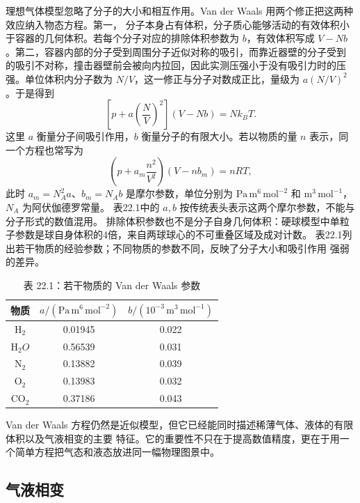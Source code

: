 理想气体模型忽略了分子的大小和相互作用。Van der Waals 用两个修正把这两种效应纳入物态方程。第一，
分子本身占有体积，分子质心能够活动的有效体积小于容器的几何体积。若每个分子对应的排除体积参数为
$b$，有效体积写成 $V-Nb$。第二，容器内部的分子受到周围分子近似对称的吸引，而靠近器壁的分子受到
的吸引不对称，撞击器壁前会被向内拉回，因此实测压强小于没有吸引力时的压强。单位体积内分子数为
$N/V$，这一修正与分子对数成正比，量级为 $a(N/V)^2$。于是得到
\begin{equation}
  \boxed{\left[p+a\left(\frac{N}{V}\right)^2\right](V-Nb)=Nk_B T}.
  \tag{22.1}
\end{equation}
这里 $a$ 衡量分子间吸引作用，$b$ 衡量分子的有限大小。若以物质的量 $n$ 表示，同一个方程也常写为
\[
  \left(p+a_m\frac{n^2}{V^2}\right)(V-nb_m)=nRT,
\]
此时 $a_m=N_A^2a$、$b_m=N_Ab$ 是摩尔参数，单位分别为
$\mathrm{Pa\,m^6\,mol^{-2}}$ 和 $\mathrm{m^3\,mol^{-1}}$，$N_A$ 为阿伏伽德罗常量。
表22.1中的 $a,b$ 按传统表头表示这两个摩尔参数，不能与分子形式的数值混用。
排除体积参数也不是分子自身几何体积：硬球模型中单粒子参数是球自身体积的4倍，来自两球球心的不可重叠区域及成对计数。
表22.1列出若干物质的经验参数；不同物质的参数不同，反映了分子大小和吸引作用
强弱的差异。

\begin{table}[htbp]
  \centering
  \caption{表 22.1：若干物质的 Van der Waals 参数}
  \renewcommand{\arraystretch}{1.12}
  \begin{tabular}{ccc}
    \toprule
    物质 & $a/(\mathrm{Pa\,m^6\,mol^{-2}})$ & $b/(10^{-3}\,\mathrm{m^3\,mol^{-1}})$ \\
    \midrule
    $\mathrm H_2$   & 0.01945 & 0.022 \\
    $\mathrm H_2O$ & 0.56539 & 0.031 \\
    $\mathrm N_2$  & 0.13882 & 0.039 \\
    $\mathrm O_2$  & 0.13983 & 0.032 \\
    $\mathrm{CO}_2$& 0.37186 & 0.043 \\
    \bottomrule
  \end{tabular}
\end{table}

Van der Waals 方程仍然是近似模型，但它已经能同时描述稀薄气体、液体的有限体积以及气液相变的主要
特征。它的重要性不只在于提高数值精度，更在于用一个简单方程把气态和液态放进同一幅物理图景中。

\subsection*{气液相变}

